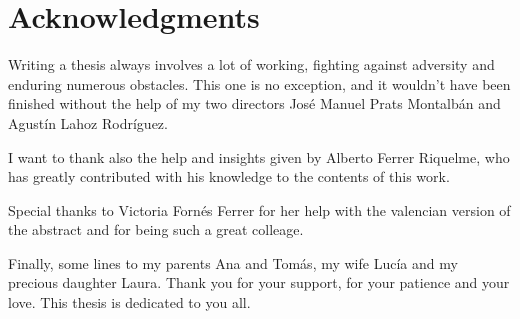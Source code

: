 \chapter*{Acknowledgments}


Writing a thesis always involves a lot of working, fighting against adversity and enduring numerous obstacles. This one is no exception, and it wouldn’t have been finished without the help of my two directors José Manuel Prats Montalbán and Agustín Lahoz Rodríguez. 

I want to thank also the help and insights given by Alberto Ferrer Riquelme, who has greatly contributed with his knowledge to the contents of this work.

Special thanks to Victoria Fornés Ferrer for her help with the valencian version of the abstract and for being such a great colleage.

Finally, some lines to my parents Ana and Tomás, my wife Lucía and my precious daughter Laura. Thank you for your support, for your patience and your love. This thesis is dedicated to you all.
